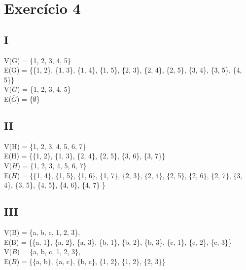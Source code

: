 \section{Exercício 4} 

\subsection{I}

V(G) = \{1, 2, 3, 4, 5\} \\
E(G) = \{\{1, 2\}, \{1, 3\}, \{1, 4\}, \{1, 5\}, \{2, 3\}, \{2, 4\}, \{2, 5\}, \{3, 4\}, \{3, 5\}, \{4, 5\}\} \\

\noindent
V($\overline{G}$) = \{1, 2, 3, 4, 5\} \\
E($\overline{G}$) = \{$\emptyset$\}


\subsection{II}

V(H) = \{1, 2, 3, 4, 5, 6, 7\} \\ 
E(H) = \{\{1, 2\}, \{1, 3\}, \{2, 4\}, \{2, 5\}, \{3, 6\}, \{3, 7\}\} \\

\noindent
V($\overline{H}$) = \{1, 2, 3, 4, 5, 6, 7\} \\
E($\overline{H}$) = \{\{1, 4\}, \{1, 5\}, \{1, 6\}, \{1, 7\}, \{2, 3\}, \{2, 4\}, \{2, 5\}, \{2, 6\}, \{2, 7\}, \{3, 4\}, \{3, 5\}, \{4, 5\}, \{4, 6\}, \{4, 7\} \}



\subsection{III}

V(B) = \{a, b, c, 1, 2, 3\}, \\
E(B) = \{\{a, 1\}, \{a, 2\}, \{a, 3\}, \{b, 1\}, \{b, 2\}, \{b, 3\}, \{c, 1\}, \{c, 2\}, \{c, 3\}\} \\

\noindent
V($\overline{B}$) = \{a, b, c, 1, 2, 3\}, \\
E($\overline{B}$) = \{\{a, b\}, \{a, c\}, \{b, c\}, \{1, 2\}, \{1, 2\}, \{2, 3\}\}

